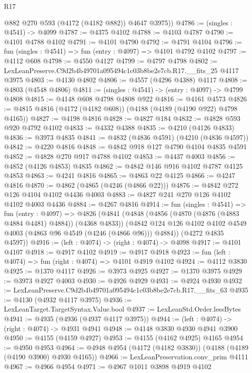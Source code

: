 \begin{lexlean}{R17}
\begin{coremodule}
        @882
        @270
        @593
        (@4172 (@4182 @882))
        @4647
        @3975))
@4786 := (singles : @4541) -> @4099
@4787 := @4375 @4102
@4788 := @4103 @4787
@4790 := @4101 @4788 @4102
@4791 := @4101 @4790
@4792 := @4791 @4104
@4796 := fun (singles : @4541) => fun (entry : @4097) => @4101 @4792 @4102
@4797 := @4112 @608
@4798 := @4550 @4127
@4799 := @4797 @4798
@4802 := LexLeanPreserve.C9d2b4b49701a095494c1c03b8be2e7cb.R17.__fits_25 @4117 @3975
@4803 := @4130 @4802
@4806 := @4557 (@4296 @4388) @4117
@4808 := @4803 (@4548 @4806)
@4811 := (singles : @4541) -> (entry : @4097) -> @4799 @4808
@4815 := @4148 @608 @4798 @4808 @922
@4816 := @4161 @4573
@4826 := @4815 @4816 (@4172 (@4182 @608)) (@4188 (@4189 (@4190 @922) @4798 @4165))
@4827 := @4198 @4816
@4828 := @4827 @184
@4832 := @4828 @593 @920 @4792 @4102
@4833 := @4332 @4388
@4835 := @4210 (@4126 @4833)
@4836 := @3973 @4835
@4841 := @4832 (@4836 @4591) (@4210 (@4836 @4597))
@4842 := @4220 @4816
@4848 := @4842 @918 @127 @4790 @4104 @4835 @4591
@4852 := @4828 @270 @917 @4788 @4102
@4853 := @4437 @4003
@4856 := @4852 (@4126 @4853) @4835
@4862 := @4842 @146 @916 @4102 @4787 @4125 @4853
@4863 := @4241 @4816
@4865 := @4863 @22 @4125
@4866 := @4247 @4816
@4870 := @4862 (@4865 (@4246 (@4866 @22)))
@4876 := @4842 @272 @126 @4104 @4102 @4436 @4003
@4883 := @4827 @241 @270 @126 @4102 @4102 @4003 @4436
@4884 := @4267 @4816
@4914 := fun (singles : @4541) =>
  fun (entry : @4097) =>
  @4826
    (@4841
      (@4848
        (@4856 (@4870 (@4876 (@4883 @4884 @4481) @4884)) (@4368 @4833))
        (@4842 @124 @126 @4102 @4102 @4549 @4003 (@4863 @96 @4549 (@4246 (@4866 @96))) @4884))
      (@4272 @4835 @4597))
@4916 := (left : @4074) -> (right : @4074) -> @4098
@4917 := @4101 @4107
@4918 := @4917 @4102
@4919 := @4917 @4918
@4923 := fun (left : @4074) => fun (right : @4074) => @4101 @4919 @4102
@4924 := @4112 @3830
@4925 := @1370 @4117
@4926 := @3973 @4925
@4927 := @1370 @3975
@4929 := @3973 @4927 @4003
@4930 := @4926 @4929
@4931 := @4924 @4930
@4932 := LexLeanPreserve.C9d2b4b49701a095494c1c03b8be2e7cb.R17.__fits_63
@4935 := @4130 (@4932 @4117 @3975)
@4936 := LexLeanTarget.TargetSyntax.Value.bool
@4937 := LexLeanStd.Order.lessBytes
@4941 := @4935 (@4936 (@4937 @4117 @3975))
@4944 := (left : @4074) -> (right : @4074) -> @4931 @4941
@4948 := @4148 @3830 @4930 @4941 @3900
@4950 := @4155 (@4159 @4927)
@4953 := @4155 (@4162 @4925) @4165
@4954 := @4950 @4953
@4964 := @4948 @4954 (@4172 (@4182 @3830)) (@4188 (@4189 (@4190 @3900) @4930 @4165))
@4966 := LexLeanPreservation.conv_prim @4111
@4967 := @4966 @4954
@4971 := @4967 @1011 @3898 @4919 @4102

\end{coremodule}
\end{lexlean}
